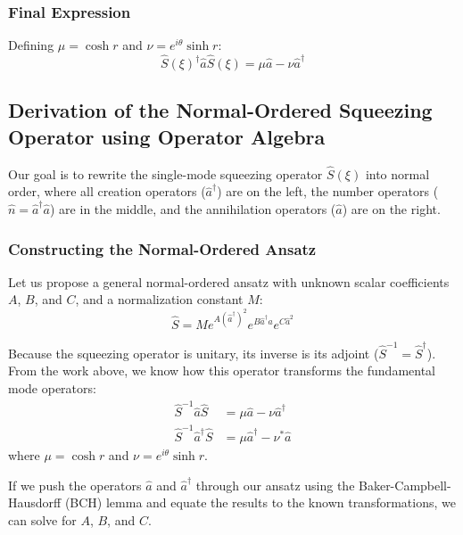 \subsubsection{Final Expression}
Defining $\mu = \cosh r$ and $\nu = e^{i\theta}\sinh r$:
\begin{equation}
\hat{S}(\xi)^\dagger \hat{a} \hat{S}(\xi) = \mu\hat{a} - \nu\hat{a}^\dagger
\end{equation}


\subsection{Derivation of the Normal-Ordered Squeezing Operator using Operator Algebra}

Our goal is to rewrite the single-mode squeezing operator $\hat{S}(\xi)$ into normal order, where all creation operators ($\hat{a}^\dagger$) are on the left, the number operators ($\hat{n} = \hat{a}^\dagger\hat{a}$) are in the middle, and the annihilation operators ($\hat{a}$) are on the right. 

\subsubsection{Constructing the Normal-Ordered Ansatz}
Let us propose a general normal-ordered ansatz with unknown scalar coefficients $A$, $B$, and $C$, and a normalization constant $M$:
\begin{equation*}
\hat{S} = M e^{A(\hat{a}^\dagger)^2} e^{B\hat{a}^\dagger\hat{a}} e^{C\hat{a}^2}
\end{equation*}

Because the squeezing operator is unitary, its inverse is its adjoint ($\hat{S}^{-1} = \hat{S}^\dagger$). From the work above, we know how this operator transforms the fundamental mode operators:
\begin{align*}
\hat{S}^{-1} \hat{a} \hat{S} &= \mu\hat{a} - \nu\hat{a}^\dagger \\
\hat{S}^{-1} \hat{a}^\dagger \hat{S} &= \mu\hat{a}^\dagger - \nu^*\hat{a}
\end{align*}
where $\mu = \cosh r$ and $\nu = e^{i\theta}\sinh r$. 

If we push the operators $\hat{a}$ and $\hat{a}^\dagger$ through our ansatz using the Baker-Campbell-Hausdorff (BCH) lemma and equate the results to the known transformations, we can solve for $A$, $B$, and $C$.

